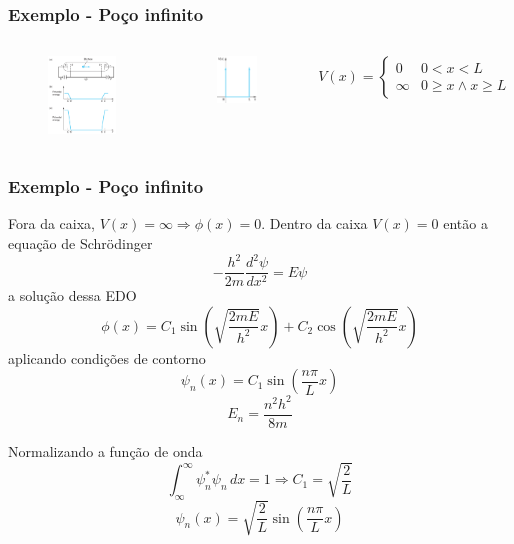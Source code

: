 \documentclass[12pt,brazil]{beamer}
\begin{document}

\begin{frame}
  \frametitle{Exemplo - Poço infinito}
  \begin{columns}[c]

  \column{5cm}
  
  \begin{figure}
    \includegraphics[width=5cm]{figuras/fig18a}
  \end{figure}
  
  \column{5cm}
  
  \begin{figure}
    \includegraphics[width=3cm]{figuras/fig18b}
  \end{figure}
  
  \fontsize{10pt}{11pt}\selectfont
  \[
    V(x) = \begin{cases}
      0 & 0< x < L\\
      \infty & 0 \geq x \wedge x\geq L
    \end{cases}
  \]
  
  
  \end{columns}
\end{frame}


\begin{frame}
  \frametitle{Exemplo - Poço infinito}  
  \fontsize{8.5pt}{11pt}\selectfont
  
  Fora da caixa, $V(x) = \infty \Rightarrow \phi(x) = 0$. Dentro da caixa $V(x) = 0$ então a equação de Schrödinger
  \[
   -\dfrac{h^2}{2m}\dfrac{d^2\psi}{dx^2}=E\psi
  \]
  a solução dessa EDO
  \[
   \phi(x) = C_1 \sin \left( \sqrt{\dfrac{2mE}{h^2}}x \right) + C_2 \cos\left( \sqrt{\dfrac{2mE}{h^2}}x \right)
  \]
  aplicando condições de contorno 
  \[
   \psi_n(x) = C_1 \sin \left( \dfrac{n\pi}{L}x \right)
  \]
  \[
   E_n = \dfrac{n^2h^2}{8m}
  \]

  Normalizando a função de onda
  \[
   \int_\infty^\infty \psi_n^*\psi_n\, dx= 1 \Rightarrow C_1 = \sqrt{\dfrac{2}{L}}
  \]
  \[
   \psi_n(x) = \sqrt{\dfrac{2}{L}} \sin \left( \dfrac{n\pi}{L}x \right)
  \]
  
\end{frame}
\end{document}
